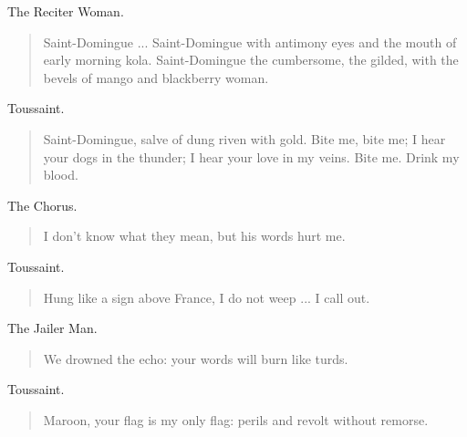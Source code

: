 \documentclass[letterpaper,article,12pt,oneside,notitlepage]{memoir}
\begin{document}
\begin{center}The Reciter Woman.\end{center}

\begin{verse}
\indent Saint-Domingue ... Saint-Domingue with antimony eyes and the mouth of early morning kola. Saint-Domingue the cumbersome, the gilded, with the bevels of mango and blackberry woman. \\
\end{verse}

\begin{center}Toussaint.\end{center}

\begin{verse}
\indent Saint-Domingue, salve of dung riven with gold. Bite me, bite me; I hear your dogs in the thunder; I hear your love in my veins. Bite me. Drink my blood. \\
\end{verse}

\begin{center}The Chorus.\end{center}

\begin{verse}
\hspace{1cm} I don't know what they mean, but his words hurt me. \\
\end{verse}

\begin{center}Toussaint.\end{center}

\begin{verse}
\indent Hung like a sign above France, I do not weep ... I call out. \\
\end{verse}

\begin{center}The Jailer Man.\end{center}

\begin{verse}
We drowned the echo: your words will burn like turds. \\
\end{verse}

\begin{center}Toussaint.\end{center}

\begin{verse}
Maroon, your flag is my only flag: perils and revolt without remorse. \\
\end{verse}
\end{document}
